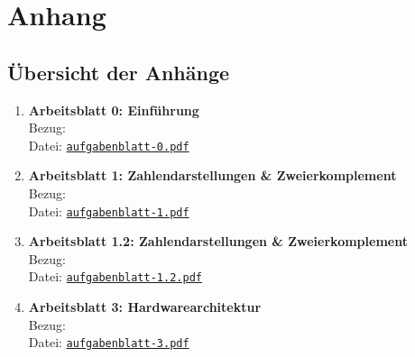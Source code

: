 \documentclass[../skript/main.tex]{subfiles}
\begin{document}
	
	
	\clearpage
	\chapter*{Anhang}
	\thispagestyle{plain}
	
	\section*{Übersicht der Anhänge}
	\begin{enumerate}
		\item \textbf{Arbeitsblatt 0: Einführung}\\
		Bezug: \\
		\small Datei: \hyperlink{ab0}{\texttt{aufgabenblatt-0.pdf}}
		
		\item \textbf{Arbeitsblatt 1: Zahlendarstellungen \& Zweierkomplement}\\
		Bezug: \\
		\small Datei: \hyperlink{ab1}{\texttt{aufgabenblatt-1.pdf}}
		
		\item \textbf{Arbeitsblatt 1.2: Zahlendarstellungen \& Zweierkomplement}\\
		Bezug: \\
		\small Datei: \hyperlink{ab1}{\texttt{aufgabenblatt-1.2.pdf}}
		
		\item \textbf{Arbeitsblatt 3: Hardwarearchitektur}\\
		Bezug: \\
		\small Datei: \hyperlink{ab1}{\texttt{aufgabenblatt-3.pdf}}
	\end{enumerate}
	
\end{document}
